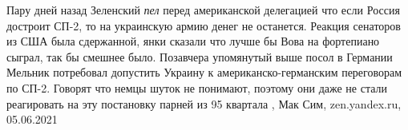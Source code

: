 Пару дней назад Зеленский \emph{пел} перед американской делегацией что если
Россия достроит СП-2, то на украинскую армию денег не останется. Реакция
сенаторов из США была сдержанной, янки сказали что лучше бы Вова на фортепиано
сыграл, так бы смешнее было.  Позавчера упомянутый выше посол в Германии
Мельник потребовал допустить Украину к американско-германским переговорам по
СП-2. Говорят что немцы шуток не понимают, поэтому они даже не стали
реагировать на эту постановку парней из 95 квартала
, 
Мак Сим, zen.yandex.ru, 05.06.2021
